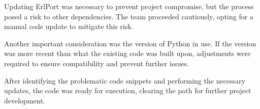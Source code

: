 Updating ErlPort was necessary to prevent project compromise, but the process posed a risk to other dependencies. The team proceeded cautiously, opting for a manual code update to mitigate this risk.\newline

Another important consideration was the version of Python in use. If the version was more recent than what the existing code was built upon, adjustments were required to ensure compatibility and prevent further issues.\newline

After identifying the problematic code snippets and performing the necessary updates, the code was ready for execution, clearing the path for further project development.



